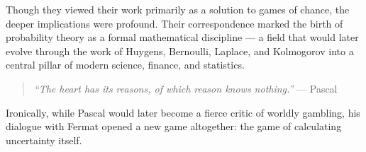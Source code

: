 Though they viewed their work primarily as a solution to games of chance, the deeper implications were profound. Their correspondence marked the birth of probability theory as a formal mathematical discipline — a field that would later evolve through the work of Huygens, Bernoulli, Laplace, and Kolmogorov into a central pillar of modern science, finance, and statistics.

\begin{quote}
    \textit{``The heart has its reasons, of which reason knows nothing.''} — Pascal  
\end{quote}

Ironically, while Pascal would later become a fierce critic of worldly gambling, his dialogue with Fermat opened a new game altogether: the game of calculating uncertainty itself.

